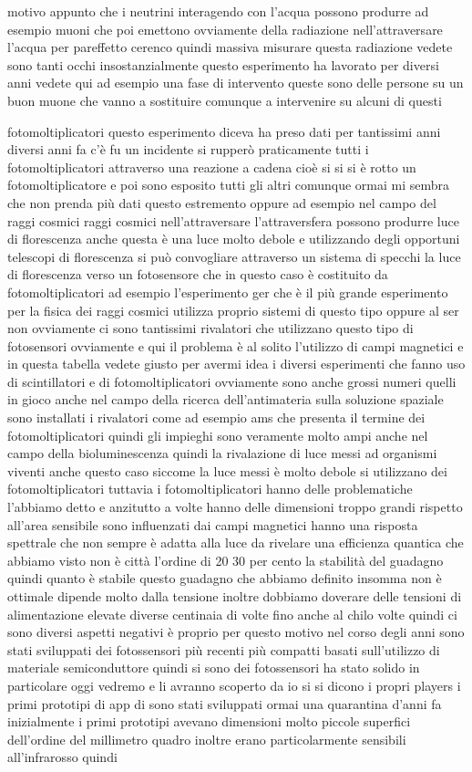 {motivo appunto che i neutrini interagendo con l'acqua possono produrre ad esempio muoni che poi emettono ovviamente della radiazione nell'attraversare l'acqua per pareffetto cerenco quindi massiva misurare questa radiazione vedete sono tanti occhi insostanzialmente questo esperimento ha lavorato per diversi anni vedete qui ad esempio una fase di intervento queste sono delle persone su un buon muone che vanno a sostituire comunque a intervenire su alcuni di questi 

fotomoltiplicatori questo esperimento diceva ha preso dati per tantissimi anni diversi anni fa c'è fu un incidente si rupperò praticamente tutti i fotomoltiplicatori attraverso una reazione a cadena cioè si si si è rotto un fotomoltiplicatore e poi sono esposito tutti gli altri comunque ormai mi sembra che non prenda più dati questo estremento oppure ad esempio nel campo del raggi cosmici raggi cosmici nell'attraversare l'attraversfera possono produrre luce di florescenza anche questa è una luce molto debole e utilizzando degli opportuni telescopi di florescenza si può convogliare attraverso un sistema di specchi la luce di florescenza verso un fotosensore che in questo caso è costituito da fotomoltiplicatori ad esempio l'esperimento ger che è il più grande esperimento per la fisica dei raggi cosmici utilizza proprio sistemi di questo tipo oppure al ser non ovviamente ci sono tantissimi rivalatori che utilizzano questo tipo di fotosensori ovviamente e qui il problema è al solito l'utilizzo di campi magnetici e in questa tabella vedete giusto per avermi idea i diversi esperimenti che fanno uso di scintillatori e di fotomoltiplicatori ovviamente sono anche grossi numeri quelli in gioco anche nel campo della ricerca dell'antimateria sulla soluzione spaziale sono installati i rivalatori come ad esempio ams che presenta il termine dei fotomoltiplicatori quindi gli impieghi sono veramente molto ampi anche nel campo della bioluminescenza quindi la rivalazione di luce messi ad organismi viventi anche questo caso siccome la luce messi è molto debole si utilizzano dei fotomoltiplicatori tuttavia i fotomoltiplicatori hanno delle problematiche l'abbiamo detto e anzitutto a volte hanno delle dimensioni troppo grandi rispetto all'area sensibile sono influenzati dai campi magnetici hanno una risposta spettrale che non sempre è adatta alla luce da rivelare una efficienza quantica che abbiamo visto non è città l'ordine di 20 30 per cento la stabilità del guadagno quindi quanto è stabile questo guadagno che abbiamo definito insomma non è ottimale dipende molto dalla tensione inoltre dobbiamo doverare delle tensioni di alimentazione elevate diverse centinaia di volte fino anche al chilo volte quindi ci sono diversi aspetti negativi è proprio per questo motivo nel corso degli anni sono stati sviluppati dei fotossensori più recenti più compatti basati sull'utilizzo di materiale semiconduttore quindi si sono dei fotossensori ha stato solido in particolare oggi vedremo e li avranno scoperto da io si si dicono i propri players i primi prototipi di app di sono stati sviluppati ormai una quarantina d'anni fa inizialmente i primi prototipi avevano dimensioni molto piccole superfici dell'ordine del millimetro quadro inoltre erano particolarmente sensibili all'infrarosso quindi }
